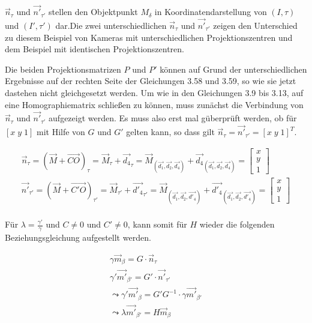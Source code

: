 $\vec{n}_\tau$ und $\vec{n'}_{\tau'}$ stellen den Objektpunkt $M_\delta$ in Koordinatendarstellung von $(I,\tau)$ und $(I', \tau')$ dar.Die zwei unterschiedlichen $\vec{n}_\tau$ und $\vec{n'}_{\tau'}$ zeigen den Unterschied zu diesem Beispiel von Kameras mit unterschiedlichen Projektionszentren und dem Beispiel mit identischen Projektionszentren. 
 
 Die beiden Projektionsmatrizen $P$ und $P'$ können auf Grund der unterschiedlichen Ergebnisse auf der rechten Seite der Gleichungen 3.58 und 3.59, so wie sie jetzt dastehen nicht gleichgesetzt werden. Um wie in den Gleichungen 3.9 bis 3.13, auf eine Homographiematrix schließen zu können, muss zunächst die Verbindung von  $\vec{n}_\tau$ und $\vec{n'}_{\tau'}$ aufgezeigt werden. Es muss also erst mal güberprüft werden, ob für $[x \; y\; 1]$ mit Hilfe von $G$ und $G'$ gelten kann, so dass gilt $\vec{n}_\tau = \vec{n'}_{\tau'} = [x \; y\; 1]^T$. 

\begin{gather}
\vec{n}_\tau = (\vec{M}+ \vec{CO})_\tau = \vec{M}_\tau + \vec{d_4}_\tau = \vec{M}_{(\vec{d_1},\vec{d_2},\vec{d_4})} + \vec{d_4}_{(\vec{d_1},\vec{d_2},\vec{d_4})} =\begin{bmatrix}x\\y\\1\end{bmatrix}\\	
\vec{n'}_{\tau'} = (\vec{M}+ \vec{C'O})_{\tau'} = \vec{M}_{\tau'} + \vec{d'_4}_{\tau'} = \vec{M}_{(\vec{d_1},\vec{d_2},\vec{d'_4})} + \vec{d'_4}_{(\vec{d_1},\vec{d_2},\vec{d'_4})} =\begin{bmatrix}x\\y\\1\end{bmatrix}\\
\end{gather}

Für $\lambda = \frac{\gamma'}{\gamma}$ und  $C \neq 0$ und $C' \neq 0$, kann somit für $H$ wieder die folgenden Beziehungsgleichung aufgestellt werden. \cite{Elements}

\begin{gather}
	\gamma \vec{m}_\beta = G \cdot \vec{n}_\tau\\
	\gamma'\vec{m'}_{\beta'} = G' \cdot \vec{n'}_{\tau'}\\
	\leadsto \gamma'\vec{m'}_\beta = G'G^{-1} \cdot \gamma \vec{m'}_{\beta'}\\
	\leadsto \lambda \vec{m'}_{\beta'} = H \vec{m}_\beta
\end{gather}


